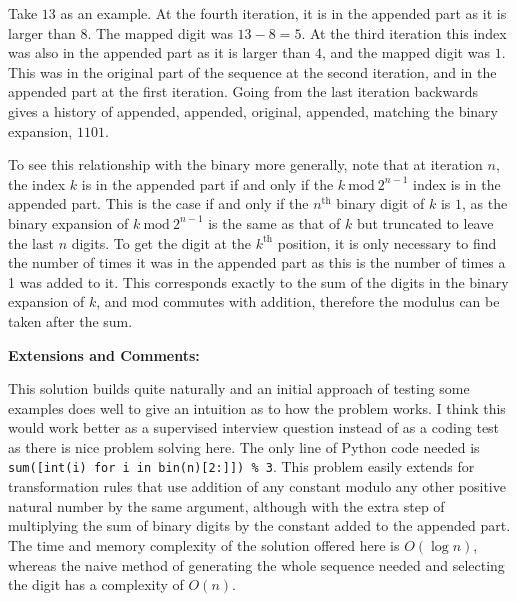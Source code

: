 Take $13$ as an example. At the fourth iteration, it is in the appended part as it is larger than $8$. The mapped digit was $13 - 8 = 5$. At the third iteration this index was also in the appended part as it is larger than $4$, and the mapped digit was $1$. This was in the original part of the sequence at the second iteration, and in the appended part at the first iteration. Going from the last iteration backwards gives a history of appended, appended, original, appended, matching the binary expansion, $1101$.

To see this relationship with the binary more generally, note that at iteration $n$, the index $k$ is in the appended part if and only if the $k \ \text{mod} \ 2^{n-1}$ index is in the appended part. This is the case if and only if the $n^\text{th}$ binary digit of $k$ is $1$, as the binary expansion of $k \ \text{mod} \ 2^{n-1}$ is the same as that of $k$ but truncated to leave the last $n$ digits. To get the digit at the $k^\text{th}$ position, it is only necessary to find the number of times it was in the appended part as this is the number of times a 1 was added to it. This corresponds exactly to the sum of the digits in the binary expansion of $k$, and $\text{mod}$ commutes with addition, therefore the modulus can be taken after the sum.

\textbf{Extensions and Comments:}

This solution builds quite naturally and an initial approach of testing some examples does well to give an intuition as to how the problem works. I think this would work better as a supervised interview question instead of as a coding test as there is nice problem solving here. The only line of Python code needed is \texttt{sum([int(i) for i in bin(n)[2:]]) \% 3}. This problem easily extends for transformation rules that use addition of any constant modulo any other positive natural number by the same argument, although with the extra step of multiplying the sum of binary digits by the constant added to the appended part. The time and memory complexity of the solution offered here is $O(\log n)$, whereas the naive method of generating the whole sequence needed and selecting the digit has a complexity of $O(n)$.